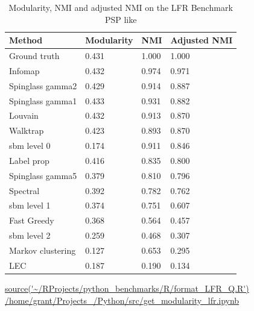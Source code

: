 \begin{table}[ht]
\centering
\setlength{\extrarowheight}{2pt}
\begin{tabular}{llll}
  \toprule
Method & Modularity & NMI & Adjusted NMI \\ 
  \midrule
Ground truth & 0.431 & 1.000 & 1.000 \\ 
  Infomap & 0.432 & 0.974 & 0.971 \\ 
  Spinglass gamma2 & 0.429 & 0.914 & 0.887 \\ 
  Spinglass gamma1 & 0.433 & 0.931 & 0.882 \\ 
  Louvain & 0.432 & 0.913 & 0.870 \\
  Walktrap & 0.423 & 0.893 & 0.870 \\ 
  sbm level 0 & 0.174 & 0.911 & 0.846 \\ 
  Label prop & 0.416 & 0.835 & 0.800 \\ 
  Spinglass gamma5 & 0.379 & 0.810 & 0.796 \\ 
  Spectral & 0.392 & 0.782 & 0.762 \\ 
  sbm level 1 & 0.374 & 0.751 & 0.607 \\ 
  Fast Greedy & 0.368 & 0.564 & 0.457 \\ 
  sbm level 2 & 0.259 & 0.468 & 0.307 \\ 
  Markov clustering & 0.127 & 0.653 & 0.295 \\ 
  LEC & 0.187 & 0.190 & 0.134 \\ 
   \bottomrule
\end{tabular}
\caption{Modularity, NMI and adjusted NMI on the LFR Benchmark PSP like} 
\tiny\url{source('~/RProjects/python_benchmarks/R/format_LFR_Q.R')}
\tiny\url{/home/grant/Projects_/Python/src/get_modularity_lfr.ipynb}
\label{tab:Modularity, NMI and adjusted NMI on the LFR Benchmark PSPlike}
\end{table}